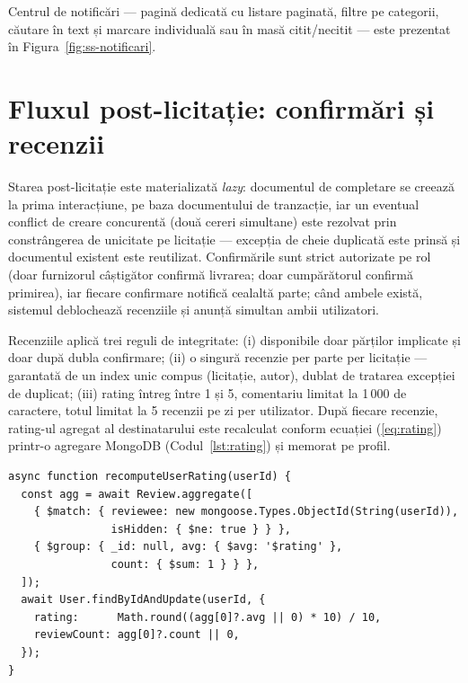 Centrul de notificări --- pagină dedicată cu listare paginată, filtre pe categorii, căutare în text și marcare individuală sau în masă citit/necitit --- este prezentat în Figura~\ref{fig:ss-notificari}.


\section{Fluxul post-licitație: confirmări și recenzii}

Starea post-licitație este materializată \textit{lazy}: documentul de completare se creează la prima interacțiune, pe baza documentului de tranzacție, iar un eventual conflict de creare concurentă (două cereri simultane) este rezolvat prin constrângerea de unicitate pe licitație --- excepția de cheie duplicată este prinsă și documentul existent este reutilizat. Confirmările sunt strict autorizate pe rol (doar furnizorul câștigător confirmă livrarea; doar cumpărătorul confirmă primirea), iar fiecare confirmare notifică cealaltă parte; când ambele există, sistemul deblochează recenziile și anunță simultan ambii utilizatori.

Recenziile aplică trei reguli de integritate: (i) disponibile doar părților implicate și doar după dubla confirmare; (ii) o singură recenzie per parte per licitație --- garantată de un index unic compus (licitație, autor), dublat de tratarea excepției de duplicat; (iii) rating întreg între 1 și 5, comentariu limitat la 1\,000 de caractere, totul limitat la 5 recenzii pe zi per utilizator. După fiecare recenzie, rating-ul agregat al destinatarului este recalculat conform ecuației (\ref{eq:rating}) printr-o agregare MongoDB (Codul~\ref{lst:rating}) și memorat pe profil.

\begin{lstlisting}[caption={Recalcularea rating-ului agregat (server/routes/reviews.js)},label={lst:rating}]
async function recomputeUserRating(userId) {
  const agg = await Review.aggregate([
    { $match: { reviewee: new mongoose.Types.ObjectId(String(userId)),
                isHidden: { $ne: true } } },
    { $group: { _id: null, avg: { $avg: '$rating' },
                count: { $sum: 1 } } },
  ]);
  await User.findByIdAndUpdate(userId, {
    rating:      Math.round((agg[0]?.avg || 0) * 10) / 10,
    reviewCount: agg[0]?.count || 0,
  });
}
\end{lstlisting}

